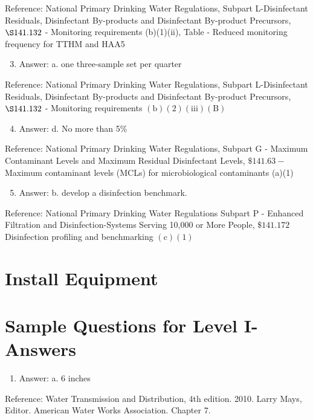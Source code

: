 \documentclass[10pt]{article}
\begin{document}
Reference: National Primary Drinking Water Regulations, Subpart L-Disinfectant Residuals, Disinfectant By-products and Disinfectant By-product Precursors, $\S 141.132$ - Monitoring requirements (b)(1)(ii), Table - Reduced monitoring frequency for TTHM and HAA5

\begin{enumerate}
  \setcounter{enumi}{2}
  \item Answer: a. one three-sample set per quarter
\end{enumerate}

Reference: National Primary Drinking Water Regulations, Subpart L-Disinfectant Residuals, Disinfectant By-products and Disinfectant By-product Precursors, $\S 141.132$ - Monitoring requirements $(\mathrm{b})(2)(\mathrm{iii})(\mathrm{B})$

\begin{enumerate}
  \setcounter{enumi}{3}
  \item Answer: d. No more than 5\%
\end{enumerate}

Reference: National Primary Drinking Water Regulations, Subpart G - Maximum Contaminant Levels and Maximum Residual Disinfectant Levels, $\$ 141.63-$ Maximum contaminant levels (MCLs) for microbiological contaminants (a)(1)

\begin{enumerate}
  \setcounter{enumi}{4}
  \item Answer: b. develop a disinfection benchmark.
\end{enumerate}

Reference: National Primary Drinking Water Regulations Subpart P - Enhanced Filtration and Disinfection-Systems Serving 10,000 or More People, $\$ 141.172$ Disinfection profiling and benchmarking $(\mathrm{c})(1)$

\section{Install Equipment}
\section{Sample Questions for Level I-Answers}
\begin{enumerate}
  \item Answer: a. 6 inches
\end{enumerate}

Reference: Water Transmission and Distribution, 4th edition. 2010. Larry Mays, Editor. American Water Works Association. Chapter 7.
\end{document}
